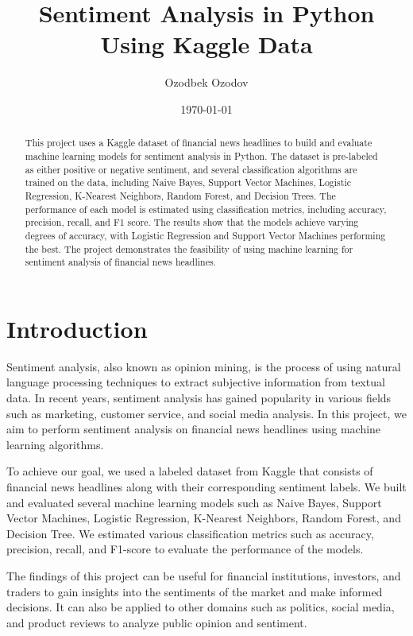 \documentclass[12pt]{article}
\title{Sentiment Analysis in Python Using Kaggle Data}
\author{Ozodbek Ozodov}
\date{\today}
\begin{document}
\maketitle

\begin{abstract}
This project uses a Kaggle dataset of financial news headlines to build and evaluate machine learning models for 
sentiment analysis in Python. The dataset is pre-labeled as either positive or negative sentiment, and several 
classification algorithms are trained on the data, including Naive Bayes, Support Vector Machines, Logistic Regression,
K-Nearest Neighbors, Random Forest, and Decision Trees. The performance of each model is estimated using 
classification metrics, including accuracy, precision, recall, and F1 score. The results show that the models 
achieve varying degrees of accuracy, with Logistic Regression and Support Vector Machines performing the best. 
 The project demonstrates the feasibility of using machine learning for sentiment analysis of financial news headlines.
\end{abstract}

\section{Introduction}
Sentiment analysis, also known as opinion mining, is the process of using natural language processing techniques to extract subjective information from textual data. In recent years, sentiment analysis has gained popularity in various fields such as marketing, customer service, and social media analysis. In this project, we aim to perform sentiment analysis on financial news headlines using machine learning algorithms.

To achieve our goal, we used a labeled dataset from Kaggle that consists of financial news headlines along with their corresponding sentiment labels. We built and evaluated several machine learning models such as Naive Bayes, Support Vector Machines, Logistic Regression, K-Nearest Neighbors, Random Forest, and Decision Tree. We estimated various classification metrics such as accuracy, precision, recall, and F1-score to evaluate the performance of the models.

The findings of this project can be useful for financial institutions, investors, and traders to gain insights into the sentiments of the market and make informed decisions. It can also be applied to other domains such as politics, social media, and product reviews to analyze public opinion and sentiment.
\end{document}
